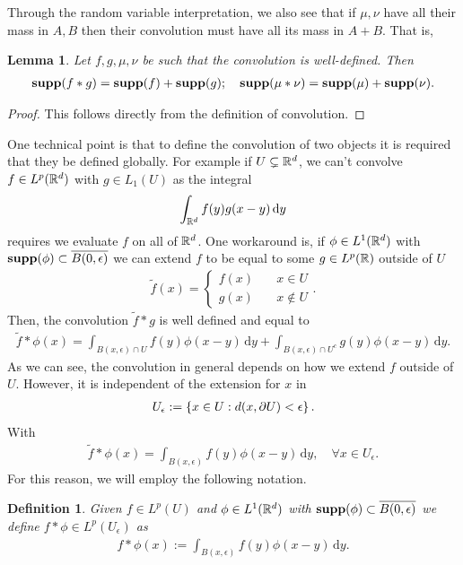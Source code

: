 \documentclass[12pt]{article}
\newtheorem{lemma}{Lemma}
\newtheorem{definition}{Definition}
\theoremstyle{remark}
\renewcommand{\d}{\,\mathrm{d}}
\begin{document}
Through the random variable interpretation, we also see that if $\mu,\nu$ have all their mass in $A, B$ then their convolution must have all its mass in  $A+B$. That is,
\begin{lemma}\label{Support}
	Let $f,g,\mu,\nu$ be such that the convolution is well-defined. Then
	\begin{align*}
		\mathbf{supp}(f*g)=\mathbf{supp}(f)+\mathbf{supp}(g); \quad \mathbf{supp}(\mu*\nu )=\mathbf{supp}(\mu )+\mathbf{supp}(\nu).
	\end{align*}
\end{lemma}
\begin{proof}
	This follows directly from the definition of convolution.
\end{proof}
One technical point is that to define the convolution of two objects it is required that they be defined globally. For example if $U \subsetneq \mathbb{R}^d $, we can't convolve $f \in L^p(\mathbb{R}^d)$ with $g \in L_1(U)$ as the integral
\begin{align*}
	\int_{\R^d}f(y)g(x-y) \d y
\end{align*}
requires we evaluate $f$ on all of  $\mathbb{R}^d$. One workaround is, if $\phi\in L^1(\mathbb{R}^d)$ with $\mathbf{supp}(\phi)\subset  \overline{B(0,\epsilon ) }$ we can extend $f$ to be equal to  some $ g \in L^p(\mathbb{R})$ outside of $U$
\begin{align*}
	\tilde{f}(x)=\begin{cases}
		             f(x) \quad & x \in U     \\
		             g(x) \quad & x \not\in U
	             \end{cases}.
\end{align*}
Then, the convolution $\tilde{f}*g$ is well defined and equal to
\begin{align*}
	\tilde{f}*\phi(x) = \int_{B(x,\epsilon )\cap U} f(y)\phi(x-y) \d y+\int_{B(x,\epsilon )\cap U^c} g(y)\phi(x-y) \d y .
\end{align*}
As we can see, the convolution in general depends on how we extend $f$ outside of $U$. However, it is independent of the extension for $x$ in
\begin{align*}
	U_\epsilon :=\left\{x \in  U : d(x,\partial U)< \epsilon \right\}.
\end{align*}
With
\begin{align*}
	\tilde{f}*\phi(x) = \int_{B(x,\epsilon )} f(y)\phi(x-y) \d y , \quad\forall x \in  U_\epsilon   .
\end{align*}
For this reason, we will employ the following notation.
\begin{definition}\label{Convolution support}
	Given $f \in L^p(U)$ and $\phi\in L^1(\mathbb{R}^d)$ with $\mathbf{supp}(\phi)\subset  \overline{B(0,\epsilon ) }$ we define $f*\phi \in L^p(U_\epsilon )$ as
	\begin{align*}
		f*\phi(x):= \int_{B(x,\epsilon )}f(y)\phi(x-y) \d y .
	\end{align*}
\end{definition}
\end{document}
